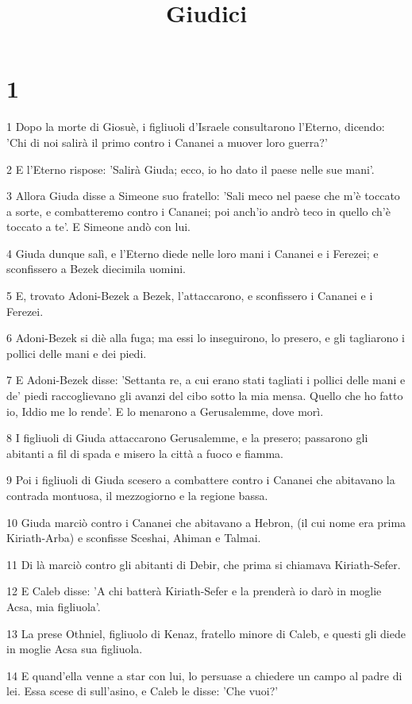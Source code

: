 

\title{Giudici}


\chapter{1}

\par 1 Dopo la morte di Giosuè, i figliuoli d'Israele consultarono l'Eterno, dicendo: 'Chi di noi salirà il primo contro i Cananei a muover loro guerra?'
\par 2 E l'Eterno rispose: 'Salirà Giuda; ecco, io ho dato il paese nelle sue mani'.
\par 3 Allora Giuda disse a Simeone suo fratello: 'Sali meco nel paese che m'è toccato a sorte, e combatteremo contro i Cananei; poi anch'io andrò teco in quello ch'è toccato a te'. E Simeone andò con lui.
\par 4 Giuda dunque salì, e l'Eterno diede nelle loro mani i Cananei e i Ferezei; e sconfissero a Bezek diecimila uomini.
\par 5 E, trovato Adoni-Bezek a Bezek, l'attaccarono, e sconfissero i Cananei e i Ferezei.
\par 6 Adoni-Bezek si diè alla fuga; ma essi lo inseguirono, lo presero, e gli tagliarono i pollici delle mani e dei piedi.
\par 7 E Adoni-Bezek disse: 'Settanta re, a cui erano stati tagliati i pollici delle mani e de' piedi raccoglievano gli avanzi del cibo sotto la mia mensa. Quello che ho fatto io, Iddio me lo rende'. E lo menarono a Gerusalemme, dove morì.
\par 8 I figliuoli di Giuda attaccarono Gerusalemme, e la presero; passarono gli abitanti a fil di spada e misero la città a fuoco e fiamma.
\par 9 Poi i figliuoli di Giuda scesero a combattere contro i Cananei che abitavano la contrada montuosa, il mezzogiorno e la regione bassa.
\par 10 Giuda marciò contro i Cananei che abitavano a Hebron, (il cui nome era prima Kiriath-Arba) e sconfisse Sceshai, Ahiman e Talmai.
\par 11 Di là marciò contro gli abitanti di Debir, che prima si chiamava Kiriath-Sefer.
\par 12 E Caleb disse: 'A chi batterà Kiriath-Sefer e la prenderà io darò in moglie Acsa, mia figliuola'.
\par 13 La prese Othniel, figliuolo di Kenaz, fratello minore di Caleb, e questi gli diede in moglie Acsa sua figliuola.
\par 14 E quand'ella venne a star con lui, lo persuase a chiedere un campo al padre di lei. Essa scese di sull'asino, e Caleb le disse: 'Che vuoi?'

